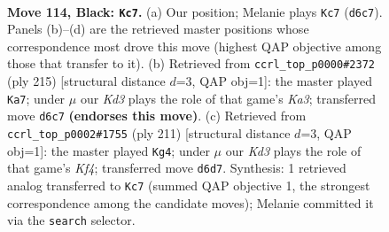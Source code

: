 \documentclass[11pt]{article}
\begin{document}
\clearpage

\begin{figure}[p]\centering
\begin{subfigure}{0.46\textwidth}\centering
\resizebox{\linewidth}{!}{%
\newchessgame
\chessboard[
  setfen={7K/8/3k4/5p2/b4P2/8/8/8 b - - 43 114},
  showmover=false,
  pgfstyle=straightmove, color=movearrow, markmove={d6-c7}
]}
\caption{}
\end{subfigure}\hfill
\begin{subfigure}{0.46\textwidth}\centering
\resizebox{\linewidth}{!}{%
\newchessgame
\chessboard[
  setfen={8/6b1/k7/8/2K5/p4N2/P7/8 b - - 73 108},
  showmover=false,
  pgfstyle=straightmove, color=movearrow, markmove={a6-a7}
]}
\caption{}
\end{subfigure}
\\[4pt]
\begin{subfigure}{0.46\textwidth}\centering
\resizebox{\linewidth}{!}{%
\newchessgame
\chessboard[
  setfen={b7/8/8/5k1p/7P/2B5/4K3/8 b - - 14 106},
  showmover=false,
  pgfstyle=straightmove, color=movearrow, markmove={f5-g4}
]}
\caption{}
\end{subfigure}\hfill

\caption{\textbf{Move 114, Black: \texttt{Kc7}.} (a) Our position; Melanie plays \texttt{Kc7} (\texttt{d6c7}). Panels (b)--(d) are the retrieved master positions whose correspondence most drove this move (highest QAP objective among those that transfer to it). (b) Retrieved from \texttt{ccrl\_top\_p0000\#2372} (ply 215) [structural distance $d$=3, QAP obj=1]: the master played \texttt{Ka7}; under $\mu$ our \emph{Kd3} plays the role of that game's \emph{Ka3}; transferred move \texttt{d6c7} \textbf{(endorses this move)}. (c) Retrieved from \texttt{ccrl\_top\_p0002\#1755} (ply 211) [structural distance $d$=3, QAP obj=1]: the master played \texttt{Kg4}; under $\mu$ our \emph{Kd3} plays the role of that game's \emph{Kf4}; transferred move \texttt{d6d7}. Synthesis: 1 retrieved analog transferred to \texttt{Kc7} (summed QAP objective 1, the strongest correspondence among the candidate moves); Melanie committed it via the \texttt{search} selector.}
\label{fig:thought-m227}
\end{figure}

\clearpage
\end{document}
